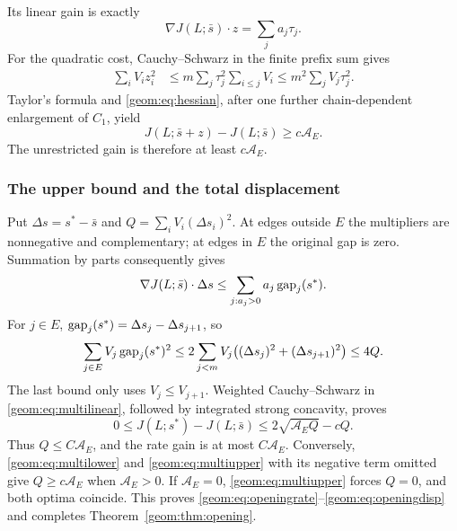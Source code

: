 Its linear gain is exactly
\[
 \nabla J(L;\bar s)\cdot z=\sum_j a_j\tau_j.
\]
For the quadratic cost, Cauchy--Schwarz in the finite prefix sum gives
\begin{align}
 \sum_iV_i z_i^2
 &\le m\sum_j\tau_j^2\sum_{i\le j}V_i
 \le m^2\sum_jV_j\tau_j^2.                       \label{geom:eq:multiquad}
\end{align}
Taylor's formula and \eqref{geom:eq:hessian}, after one further
chain-dependent enlargement of \(C_1\), yield
\begin{equation}
 J(L;\bar s+z)-J(L;\bar s)\ge c\mathcal A_E.      \label{geom:eq:multilower}
\end{equation}
The unrestricted gain is therefore at least \(c\mathcal A_E\).

\subsubsection{The upper bound and the total displacement}

Put \(\Delta s=s^*-\bar s\) and
\(Q=\sum_iV_i(\Delta s_i)^2\).
At edges outside \(E\) the multipliers are nonnegative and
complementary; at edges in \(E\) the original gap is zero.
Summation by parts consequently gives
\begin{equation}
 \nabla J(L;\bar s)\cdot\Delta s
 \le\sum_{j:a_j>0}a_j\operatorname{gap}_j(s^*).                 \label{geom:eq:multilinear}
\end{equation}
For \(j\in E\), \(\operatorname{gap}_j(s^*)=\Delta s_j-\Delta s_{j+1}\), so
\begin{equation}
 \sum_{j\in E}V_j\operatorname{gap}_j(s^*)^2
 \le2\sum_{j<m}V_j\bigl((\Delta s_j)^2+
                              (\Delta s_{j+1})^2\bigr)
 \le4Q.                                         \label{geom:eq:gapQ}
\end{equation}
The last bound only uses \(V_j\le V_{j+1}\).
Weighted Cauchy--Schwarz in \eqref{geom:eq:multilinear}, followed by
integrated strong concavity, proves
\begin{equation}
 0\le J(L;s^*)-J(L;\bar s)
             \le2\sqrt{\mathcal A_EQ}-cQ.       \label{geom:eq:multiupper}
\end{equation}
Thus \(Q\le C\mathcal A_E\), and the rate gain is at most
\(C\mathcal A_E\).  Conversely, \eqref{geom:eq:multilower} and
\eqref{geom:eq:multiupper} with its negative term omitted give
\(Q\ge c\mathcal A_E\) when \(\mathcal A_E>0\).
If \(\mathcal A_E=0\), \eqref{geom:eq:multiupper} forces \(Q=0\),
and both optima coincide.  This proves
\eqref{geom:eq:openingrate}--\eqref{geom:eq:openingdisp} and completes
Theorem~\ref{geom:thm:opening}.

